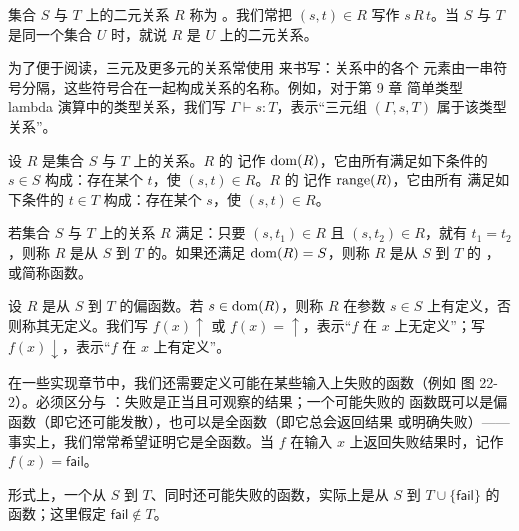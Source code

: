 \begin{definition}
\label{def:2.1.5}
集合 \(S\) 与 \(T\) 上的二元关系 \(R\) 称为
。我们常把 \((s,t)\in R\) 写作
\(s\,R\,t\)。当 \(S\) 与 \(T\) 是同一个集合 \(U\) 时，就说 \(R\) 是
\(U\) 上的二元关系。
\end{definition}

\begin{definition}
\label{def:2.1.6}
为了便于阅读，三元及更多元的关系常使用
来书写：关系中的各个
元素由一串符号分隔，这些符号合在一起构成关系的名称。例如，对于第 9 章
简单类型 lambda 演算中的类型关系，我们写
\(\Gamma\vdash s:T\)，表示“三元组 \((\Gamma,s,T)\) 属于该类型关系”。
\end{definition}

\begin{definition}
\label{def:2.1.7}
设 \(R\) 是集合 \(S\) 与 \(T\) 上的关系。\(R\) 的
记作 \(\operatorname{dom}(R)\)，它由所有满足如下条件的
\(s\in S\) 构成：存在某个 \(t\)，使 \((s,t)\in R\)。\(R\) 的
记作 \(\operatorname{range}(R)\)，它由所有
满足如下条件的 \(t\in T\) 构成：存在某个 \(s\)，使 \((s,t)\in R\)。
\end{definition}


\begin{definition}
\label{def:2.1.8}
若集合 \(S\) 与 \(T\) 上的关系 \(R\) 满足：只要
\((s,t_1)\in R\) 且 \((s,t_2)\in R\)，就有 \(t_1=t_2\)，则称 \(R\)
是从 \(S\) 到 \(T\) 的。如果还满足
\(\operatorname{dom}(R)=S\)，则称 \(R\) 是从 \(S\) 到 \(T\) 的
，或简称函数。
\end{definition}

\begin{definition}
\label{def:2.1.9}
设 \(R\) 是从 \(S\) 到 \(T\) 的偏函数。若 \(s\in\operatorname{dom}(R)\)，则称 \(R\)
在参数 \(s\in S\) 上有定义，否则称其无定义。我们写 \(f(x)\uparrow\) 或
\(f(x)={}\uparrow\)，表示“\(f\) 在 \(x\) 上无定义”；写
\(f(x)\downarrow\)，表示“\(f\) 在 \(x\) 上有定义”。

在一些实现章节中，我们还需要定义可能在某些输入上失败的函数（例如
图 22-2）。必须区分与
：失败是正当且可观察的结果；一个可能失败的
函数既可以是偏函数（即它还可能发散），也可以是全函数（即它总会返回结果
或明确失败）——事实上，我们常常希望证明它是全函数。当 \(f\) 在输入 \(x\)
上返回失败结果时，记作 \(f(x)=\mathsf{fail}\)。

形式上，一个从 \(S\) 到 \(T\)、同时还可能失败的函数，实际上是从 \(S\)
到 \(T\cup\{\mathsf{fail}\}\) 的函数；这里假定
\(\mathsf{fail}\notin T\)。
\end{definition}

